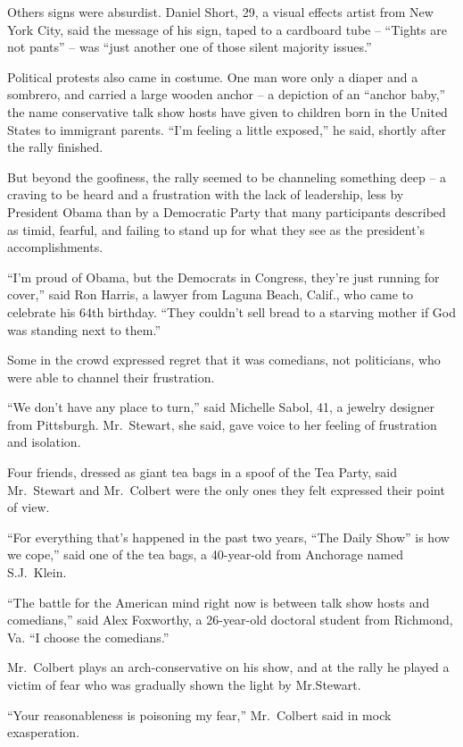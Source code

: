 ﻿\documentclass[12pt]{article}
\begin{document}
Others signs were absurdist. Daniel Short, 29, a visual effects artist from New York City, said the
message of his sign, taped to a cardboard tube -- ``Tights are not pants'' -- was ``just another one
of those silent majority issues.''

Political protests also came in costume. One man wore only a diaper and a sombrero, and carried a
large wooden anchor -- a depiction of an ``anchor baby,'' the name conservative talk show hosts have
given to children born in the United States to immigrant parents. ``I'm feeling a little exposed,''
he said, shortly after the rally finished.

But beyond the goofiness, the rally seemed to be channeling something deep -- a craving to be heard
and a frustration with the lack of leadership, less by President Obama than by a Democratic Party
that many participants described as timid, fearful, and failing to stand up for what they see as the
president's accomplishments.

``I'm proud of Obama, but the Democrats in Congress, they're just running for cover,'' said Ron
Harris, a lawyer from Laguna Beach, Calif., who came to celebrate his 64th birthday. ``They couldn't
sell bread to a starving mother if God was standing next to them.''

Some in the crowd expressed regret that it was comedians, not politicians, who were able to channel
their frustration.

``We don't have any place to turn,'' said Michelle Sabol, 41, a jewelry designer from Pittsburgh.
Mr.~Stewart, she said, gave voice to her feeling of frustration and isolation.

Four friends, dressed as giant tea bags in a spoof of the Tea Party, said Mr.~Stewart and
Mr.~Colbert were the only ones they felt expressed their point of view.

``For everything that's happened in the past two years, ``The Daily Show'' is how we cope,'' said
one of the tea bags, a 40-year-old from Anchorage named S.J.~Klein.

``The battle for the American mind right now is between talk show hosts and comedians,'' said Alex
Foxworthy, a 26-year-old doctoral student from Richmond, Va. ``I choose the comedians.''

Mr.~Colbert plays an arch-conservative on his show, and at the rally he played a victim of fear who
was gradually shown the light by Mr.Stewart.

``Your reasonableness is poisoning my fear,'' Mr.~Colbert said in mock exasperation.
\end{document}
